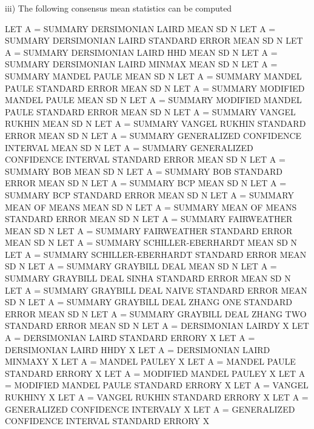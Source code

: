 {        iii) The following consensus mean statistics can be computed

                  LET A = SUMMARY DERSIMONIAN LAIRD MEAN SD N
                  LET A = SUMMARY DERSIMONIAN LAIRD STANDARD ERROR MEAN SD N
                  LET A = SUMMARY DERSIMONIAN LAIRD HHD MEAN SD N
                  LET A = SUMMARY DERSIMONIAN LAIRD MINMAX MEAN SD N
                  LET A = SUMMARY MANDEL PAULE MEAN SD N
                  LET A = SUMMARY MANDEL PAULE STANDARD ERROR MEAN SD N
                  LET A = SUMMARY MODIFIED MANDEL PAULE MEAN SD N
                  LET A = SUMMARY MODIFIED MANDEL PAULE STANDARD ERROR MEAN SD N
                  LET A = SUMMARY VANGEL RUKHIN MEAN SD N
                  LET A = SUMMARY VANGEL RUKHIN STANDARD ERROR MEAN SD N
                  LET A = SUMMARY GENERALIZED CONFIDENCE INTERVAL MEAN SD N
                  LET A = SUMMARY GENERALIZED CONFIDENCE INTERVAL STANDARD ERROR
                                  MEAN SD N
                  LET A = SUMMARY BOB MEAN SD N
                  LET A = SUMMARY BOB STANDARD ERROR MEAN SD N
                  LET A = SUMMARY BCP MEAN SD N
                  LET A = SUMMARY BCP STANDARD ERROR MEAN SD N
                  LET A = SUMMARY MEAN OF MEANS MEAN SD N
                  LET A = SUMMARY MEAN OF MEANS STANDARD ERROR MEAN SD N
                  LET A = SUMMARY FAIRWEATHER MEAN SD N
                  LET A = SUMMARY FAIRWEATHER STANDARD ERROR MEAN SD N
                  LET A = SUMMARY SCHILLER-EBERHARDT MEAN SD N
                  LET A = SUMMARY SCHILLER-EBERHARDT STANDARD ERROR MEAN SD N
                  LET A = SUMMARY GRAYBILL DEAL MEAN SD N
                  LET A = SUMMARY GRAYBILL DEAL SINHA STANDARD ERROR MEAN SD N
                  LET A = SUMMARY GRAYBILL DEAL NAIVE STANDARD ERROR MEAN SD N
                  LET A = SUMMARY GRAYBILL DEAL ZHANG ONE STANDARD ERROR MEAN SD N
                  LET A = SUMMARY GRAYBILL DEAL ZHANG TWO STANDARD ERROR MEAN SD N
                  LET A = DERSIMONIAN LAIRDY X
                  LET A = DERSIMONIAN LAIRD STANDARD ERRORY X
                  LET A = DERSIMONIAN LAIRD HHDY X
                  LET A = DERSIMONIAN LAIRD MINMAXY X
                  LET A = MANDEL PAULEY X
                  LET A = MANDEL PAULE STANDARD ERRORY X
                  LET A = MODIFIED MANDEL PAULEY X
                  LET A = MODIFIED MANDEL PAULE STANDARD ERRORY X
                  LET A = VANGEL RUKHINY X
                  LET A = VANGEL RUKHIN STANDARD ERRORY X
                  LET A = GENERALIZED CONFIDENCE INTERVALY X
                  LET A = GENERALIZED CONFIDENCE INTERVAL STANDARD ERRORY X
}

